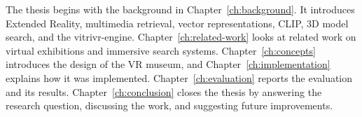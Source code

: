 The thesis begins with the background in Chapter~\ref{ch:background}. It introduces Extended Reality, multimedia retrieval, vector representations, CLIP, 3D model search, and the vitrivr-engine. Chapter~\ref{ch:related-work} looks at related work on virtual exhibitions and immersive search systems. Chapter~\ref{ch:concepts} introduces the design of the VR museum, and Chapter~\ref{ch:implementation} explains how it was implemented. Chapter~\ref{ch:evaluation} reports the evaluation and its results. Chapter~\ref{ch:conclusion} closes the thesis by answering the research question, discussing the work, and suggesting future improvements.

\endgroup
